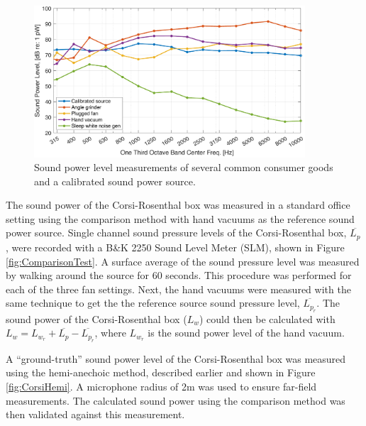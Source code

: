 \documentclass[letterpaper,12pt]{article}
\begin{document}
\begin{figure}[h!]
    \centering
    \includegraphics[width=0.9\textwidth]{manuscript/fig/SourceComparison}
    \caption{Sound power level measurements of several common consumer goods and a calibrated sound power source.}
    \label{fig:SourceComparison}
\end{figure}

The sound power of the Corsi-Rosenthal box was measured in a standard office setting using the comparison method with hand vacuums as the reference sound power source. Single channel sound pressure levels of the Corsi-Rosenthal box, $\overline{L_{p}}$, were recorded with a B\&K 2250 Sound Level Meter (SLM), shown in Figure \ref{fig:ComparisonTest}. A surface average of the sound pressure level was measured by walking around the source for 60 seconds. This procedure was performed for each of the three fan settings. Next, the hand vacuums were measured with the same technique to get the the reference source sound pressure level, $\overline{L_{p_r}}$. The sound power of the Corsi-Rosenthal box ($L_w$) could then be calculated with $L_{w} = L_{w_r} + \overline{L_{p}} - \overline{L_{p_r}}\label{eqn:Lw}$, where $L_{w_r}$ is the sound power level of the hand vacuum.

A ``ground-truth'' sound power level of the Corsi-Rosenthal box was measured using the hemi-anechoic method, described earlier and shown in Figure \ref{fig:CorsiHemi}. A microphone radius of 2m was used to ensure far-field measurements. The calculated sound power using the comparison method was then validated against this measurement.
\end{document}

